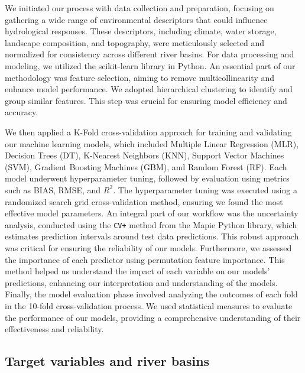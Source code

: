 \documentclass[12pt]{article}
\begin{document}
\par We initiated our process with data collection and preparation, focusing on gathering a wide range of environmental descriptors that could influence hydrological responses. These descriptors, including climate, water storage, landscape composition, and topography, were meticulously selected and normalized for consistency across different river basins. For data processing and modeling, we utilized the scikit-learn library in Python. An essential part of our methodology was feature selection, aiming to remove multicollinearity and enhance model performance. We adopted hierarchical clustering to identify and group similar features. This step was crucial for ensuring model efficiency and accuracy.

\par We then applied a K-Fold cross-validation approach for training and validating our machine learning models, which included Multiple Linear Regression (MLR), Decision Trees (DT), K-Nearest Neighbors (KNN), Support Vector Machines (SVM), Gradient Boosting Machines (GBM), and Random Forest (RF). Each model underwent hyperparameter tuning, followed by evaluation using metrics such as BIAS, RMSE, and \( R^2 \). The hyperparameter tuning was executed using a randomized search grid cross-validation method, ensuring we found the most effective model parameters. An integral part of our workflow was the uncertainty analysis, conducted using the \texttt{CV+} method from the Mapie Python library, which estimates prediction intervals around test data predictions. This robust approach was critical for ensuring the reliability of our models. Furthermore, we assessed the importance of each predictor using permutation feature importance. This method helped us understand the impact of each variable on our models' predictions, enhancing our interpretation and understanding of the models. Finally, the model evaluation phase involved analyzing the outcomes of each fold in the 10-fold cross-validation process. We used statistical measures to evaluate the performance of our models, providing a comprehensive understanding of their effectiveness and reliability. 

\subsection{Target variables and river basins} \label{sec:methods:target}
\end{document}

